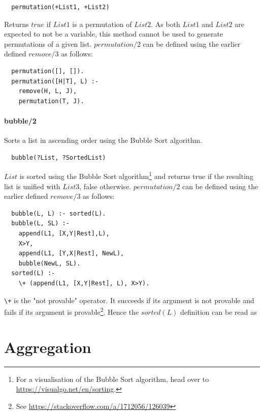 \documentclass{article}
\begin{document}
\begin{multicols}{2}
  \begin{lstlisting}
  permutation(+List1, +List2)
  \end{lstlisting}
  
  Returns $true$ if $List1$ is a permutation of $List2$. As both $List1$ and $List2$ are expected to not be a variable, this method cannot be used to generate permutations of a given list. $permutation/2$ can be defined using the earlier defined $remove/3$ as follows:

  \begin{lstlisting}
  permutation([], []).
  permutation([H|T], L) :-
    remove(H, L, J),
    permutation(T, J).
  \end{lstlisting}  
  
  \paragraph{bubble/2} Sorts a list in ascending order using the Bubble Sort algorithm.
  
  \begin{lstlisting}
  bubble(?List, ?SortedList)
  \end{lstlisting}
  
  $List$ is sorted using the Bubble Sort algorithm\footnote{For a visualisation of the Bubble Sort algorithm, head over to \href{https://visualgo.net/en/sorting}{https://visualgo.net/en/sorting}.} and returns true if the resulting list is unified with $List3$, false otherwise. $permutation/2$ can be defined using the earlier defined $remove/3$ as follows:

  \begin{lstlisting}
  bubble(L, L) :- sorted(L).
  bubble(L, SL) :-
    append(L1, [X,Y|Rest],L),
    X>Y,
    append(L1, [Y,X|Rest], NewL),
    bubble(NewL, SL).
  sorted(L) :-
    \+ (append(L1, [X,Y|Rest], L), X>Y).
  \end{lstlisting}  

  \lstinline{\+} is the "not provable" operator. It succeeds if its argument is not provable and fails if its argument is provable\footnote{See \href{https://stackoverflow.com/a/1712056/126039}{https://stackoverflow.com/a/1712056/126039}}. Hence the $sorted(L)$ definition can be read as 
  
  \section{Aggregation}
  

\end{multicols}
\end{document}
